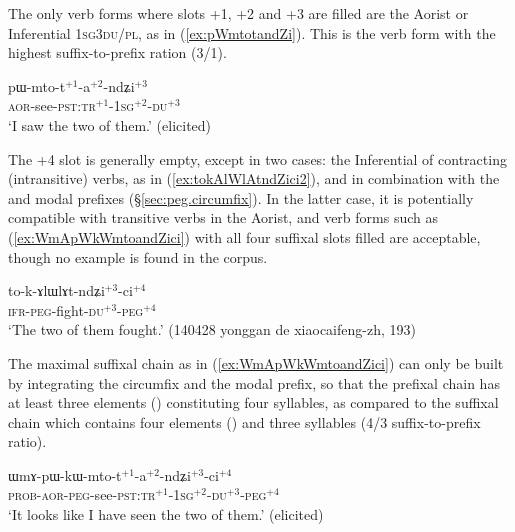 The only verb forms where slots +1, +2 and +3 are filled are the Aorist or Inferential \textsc{1sg}\fl{}3\textsc{du/pl}, as in (\ref{ex:pWmtotandZi}). This is the verb form with the highest suffix-to-prefix ration (3/1).

\begin{exe}
\ex \label{ex:pWmtotandZi}
\gll pɯ-mto-t$^{+1}$-a$^{+2}$-ndʑi$^{+3}$\\
\textsc{aor}-see-\textsc{pst}:\textsc{tr}$^{+1}$-\textsc{1sg}$^{+2}$-\textsc{du}$^{+3}$ \\
\glt `I saw the two of them.' (elicited)
\end{exe}
 
The +4 slot is generally empty, except in two cases: the Inferential of contracting (intransitive) verbs, as in (\ref{ex:tokAlWlAtndZici2}), and  in combination with the  and  modal prefixes (§\ref{sec:peg.circumfix}). In the latter case, it is potentially compatible with transitive verbs in the Aorist, and verb forms such as (\ref{ex:WmApWkWmtoandZici}) with all four suffixal slots filled are acceptable, though no example is found in the corpus.

\begin{exe}
\ex \label{ex:tokAlWlAtndZici2}
\gll to-k-ɤlɯlɤt-ndʑi$^{+3}$-ci$^{+4}$ \\
\textsc{ifr}-\textsc{peg}-fight-\textsc{du}$^{+3}$-\textsc{peg}$^{+4}$ \\
\glt `The two of them fought.' (140428 yonggan de xiaocaifeng-zh, 193)
\end{exe}
 
The maximal suffixal chain as in (\ref{ex:WmApWkWmtoandZici}) can only be built by integrating the circumfix   and the modal  prefix, so that the prefixal chain has at least three elements () constituting four syllables, as compared to the suffixal chain which contains  four elements () and three syllables (4/3 suffix-to-prefix ratio).
 
\begin{exe}
\ex \label{ex:WmApWkWmtoandZici}
\gll  ɯmɤ-pɯ-kɯ-mto-t$^{+1}$-a$^{+2}$-ndʑi$^{+3}$-ci$^{+4}$ \\
 \textsc{prob}-\textsc{aor}-\textsc{peg}-see-\textsc{pst}:\textsc{tr}$^{+1}$-\textsc{1sg}$^{+2}$-\textsc{du}$^{+3}$-\textsc{peg}$^{+4}$ \\
 \glt `It looks like I have seen the two of them.' (elicited)
\end{exe} 
 

